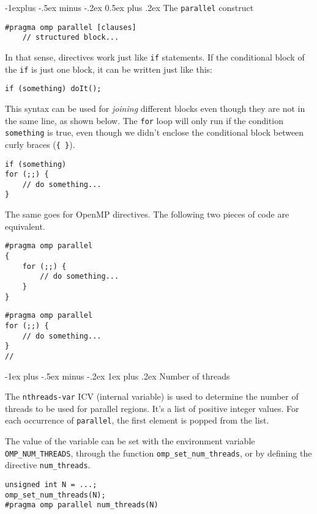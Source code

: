 \documentclass[10pt,landscape]{article}
\makeatletter
\renewcommand{\subsection}{\@startsection{subsection}{2}{0mm}%
                                {-1explus -.5ex minus -.2ex}%
                                {0.5ex plus .2ex}%
                                {\normalfont\normalsize\bfseries}}
\renewcommand{\subsubsection}{\@startsection{subsubsection}{3}{0mm}%
                                {-1ex plus -.5ex minus -.2ex}%
                                {1ex plus .2ex}%
                                {\normalfont\small\bfseries}}
\makeatother
\begin{document}
\begin{multicols}{3}
\subsection{The \texttt{parallel} construct}
\begin{verbatim}
#pragma omp parallel [clauses]
    // structured block...
\end{verbatim}
\par
In that sense, directives work just like \texttt{if} statements. If the conditional block of the \texttt{if} is just one block, it can be written just like this:
\begin{verbatim}
if (something) doIt();
\end{verbatim}
\par
This syntax can be used for \textit{joining} different blocks even though they are not in the same line, as shown below. The \texttt{for} loop will only run if the condition \texttt{something} is true, even though we didn't enclose the conditional block between curly braces (\texttt{\{ \}}).
\begin{verbatim}
if (something)
for (;;) {
    // do something...
}
\end{verbatim}
\par
The same goes for OpenMP directives. The following two pieces of code are equivalent.
\begin{multicols}{2}
\begin{verbatim}
#pragma omp parallel
{
    for (;;) {
        // do something...
    }
}
\end{verbatim}
\begin{verbatim}
#pragma omp parallel
for (;;) {
    // do something...
}
//
\end{verbatim}
\end{multicols}
\subsubsection{Number of threads}
\par
The \texttt{nthreads-var} ICV (internal variable) is used to determine the number of threads to be used for parallel regions. It's a list of positive integer values. For each occurrence of \texttt{parallel}, the first element is popped from the list.
\par
The value of the variable can be set with the environment variable \texttt{OMP\_NUM\_THREADS}, through the function \texttt{omp\_set\_num\_threads}, or by defining the directive \texttt{num\_threads}.
\begin{verbatim}
unsigned int N = ...;
omp_set_num_threads(N);
#pragma omp parallel num_threads(N)
\end{verbatim}

\end{multicols}
\end{document}
